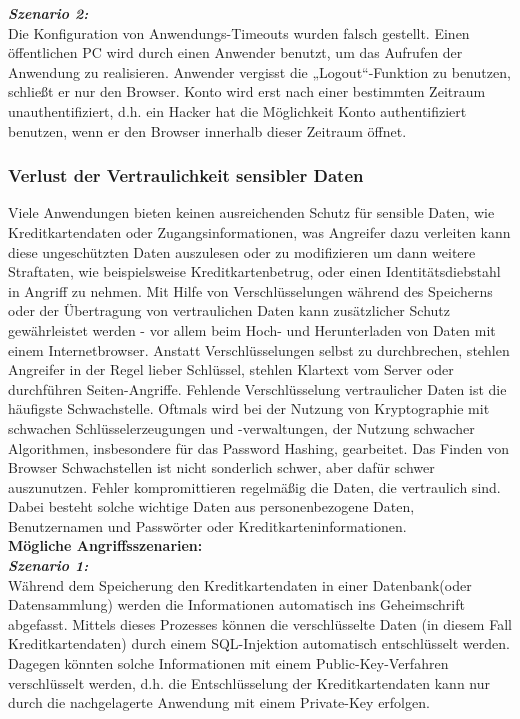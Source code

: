 \textbf{\textit{Szenario 2:}}\\
 Die Konfiguration von Anwendungs-Timeouts wurden falsch gestellt. Einen öffentlichen PC wird durch einen Anwender benutzt, um das Aufrufen der Anwendung zu realisieren. Anwender vergisst die „Logout“-Funktion zu benutzen, schließt er nur den Browser. Konto wird erst nach einer bestimmten Zeitraum unauthentifiziert, d.h. ein Hacker hat die Möglichkeit Konto authentifiziert benutzen, wenn er den Browser innerhalb dieser Zeitraum öffnet\cite{owasp13top10}.\\

\subsubsection{Verlust der Vertraulichkeit sensibler Daten}

Viele Anwendungen bieten keinen ausreichenden Schutz für sensible Daten, wie Kreditkartendaten oder Zugangsinformationen, was Angreifer dazu verleiten kann diese ungeschützten Daten auszulesen oder zu modifizieren um dann weitere Straftaten, wie beispielsweise Kreditkartenbetrug, oder einen Identitätsdiebstahl in Angriff zu nehmen. Mit  Hilfe von Verschlüsselungen während des Speicherns oder der Übertragung von vertraulichen Daten kann zusätzlicher Schutz gewährleistet werden - vor allem beim Hoch- und Herunterladen von Daten mit einem Internetbrowser. Anstatt Verschlüsselungen selbst zu durchbrechen, stehlen Angreifer in der Regel lieber Schlüssel, stehlen Klartext vom Server oder durchführen Seiten-Angriffe. Fehlende Verschlüsselung vertraulicher Daten ist die häufigste Schwachstelle. Oftmals wird bei der Nutzung von Kryptographie mit schwachen Schlüsselerzeugungen und -verwaltungen, der Nutzung schwacher Algorithmen, insbesondere für das Password Hashing, gearbeitet. Das Finden von Browser Schwachstellen ist nicht sonderlich schwer, aber dafür schwer auszunutzen. Fehler kompromittieren regelmäßig die Daten, die vertraulich sind. Dabei besteht solche wichtige Daten aus personenbezogene Daten, Benutzernamen und Passwörter oder Kreditkarteninformationen\cite{owasp13top10}.\\

\textbf{Mögliche Angriffsszenarien:}\\

\textbf{\textit{Szenario 1:}}\\

Während dem Speicherung den Kreditkartendaten in einer Datenbank(oder Datensammlung) werden die Informationen automatisch ins Geheimschrift abgefasst. Mittels dieses Prozesses können die verschlüsselte Daten (in diesem Fall Kreditkartendaten) durch einem SQL-Injektion automatisch entschlüsselt werden. Dagegen könnten solche Informationen mit einem Public-Key-Verfahren verschlüsselt werden, d.h. die Entschlüsselung der Kreditkartendaten kann nur durch die nachgelagerte Anwendung mit einem Private-Key erfolgen\cite{owasp13top10}.\\

